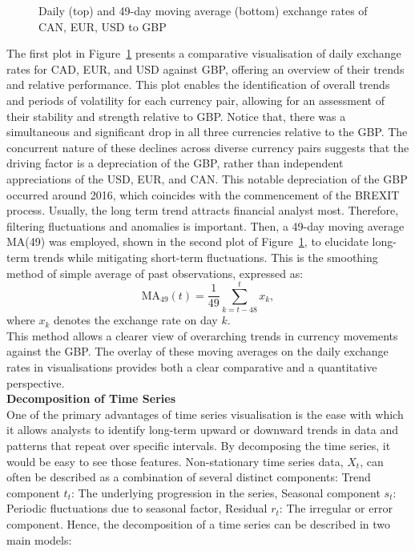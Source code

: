 \documentclass{article}\usepackage[]{graphicx}\usepackage[]{xcolor}
\newenvironment{knitrout}{}{} %
\numberwithin{equation}{section}
\begin{document}
\begin{knitrout}
\begin{figure}[H]
{}

\caption[Daily (top) and 49-day moving average (bottom) exchange rates of CAN, EUR, USD to GBP]{Daily (top) and 49-day moving average (bottom) exchange rates of CAN, EUR, USD to GBP}\label{fig:all exchange rates}
\end{figure}

\end{knitrout}

\noindent
The first plot in Figure~\ref{fig:all exchange rates} presents a comparative visualisation of daily exchange rates for CAD, EUR, and USD against GBP, offering an overview of their trends and relative performance. This plot enables the identification of overall trends and periods of volatility for each currency pair, allowing for an assessment of their stability and strength relative to GBP. Notice that, there was a simultaneous and significant drop in all three currencies relative to the GBP. The concurrent nature of these declines across diverse currency pairs suggests that the driving factor is a depreciation of the GBP, rather than independent appreciations of the USD, EUR, and CAN. This notable depreciation of the GBP occurred around 2016, which coincides with the commencement of the BREXIT process. Usually, the long term trend attracts financial analyst most. Therefore, filtering fluctuations and anomalies is important. Then, a 49-day moving average MA(49) was employed, shown in the second plot of Figure~\ref{fig:all exchange rates}, to elucidate long-term trends while mitigating short-term fluctuations. This is the smoothing method of simple average of past observations, expressed as:
\[\text{MA}_{49}(t) = \frac{1}{49} \sum_{k=t-48}^{t} x_k,\] 
where \( x_k \) denotes the exchange rate on day $k$.\\

\noindent
This method allows a clearer view of overarching trends in currency movements against the GBP. The overlay of these moving averages on the daily exchange rates in visualisations provides both a clear comparative and a quantitative perspective.\\

\noindent
\textbf{Decomposition of Time Series}\\
\noindent
One of the primary advantages of time series visualisation is the ease with which it allows analysts to identify long-term upward or downward trends in data and patterns that repeat over specific intervals. By decomposing the time series, it would be easy to see those features. Non-stationary time series data, $X_t$, can often be described as a combination of several distinct components: Trend component $t_t$: The underlying progression in the series, Seasonal component $s_t$: Periodic fluctuations due to seasonal factor, Residual $r_t$: The irregular or error component. Hence, the decomposition of a time series can be described in two main models:
\\
\end{document}
